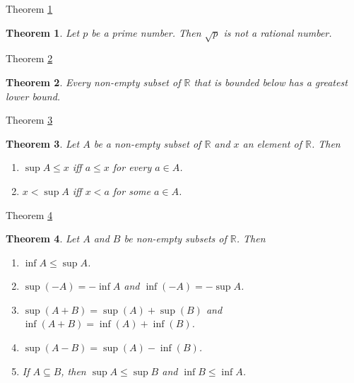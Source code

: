 \documentclass[avery5371,grid]{flashcards}
\newtheorem{theorem}{Theorem}
\newcommand{\bb}[1]{\mathbb{#1}}
\newcommand{\R}{\bb{R}}
\begin{document}
\begin{flashcard}[Theorem]{Theorem \ref{thm29}}
\begin{theorem}
\label{thm29}
Let $p$ be a prime number.  Then $\sqrt{p}$ is not a rational number.
\end{theorem}
\end{flashcard}

\begin{flashcard}[Theorem]{Theorem \ref{thm30}}
\begin{theorem}
\label{thm30}
Every non-empty subset of $\R$ that is bounded below has a greatest
lower bound.
\end{theorem}
\end{flashcard}

\begin{flashcard}[Theorem]{Theorem \ref{thm31}}
\begin{theorem}
\label{thm31}
Let $A$ be a non-empty subset of $\R$ and $x$ an element of $\R$.  Then
\begin{enumerate}
\item $\sup A \leq x$ iff $a \leq x$ for every $a \in A$.
\item $x<\sup A$ iff $x<a$ for some $a \in A$.
\end{enumerate}
\end{theorem}
\end{flashcard}

\begin{flashcard}[Theorem]{Theorem \ref{thm32}}
\begin{theorem}
\label{thm32}
Let $A$ and $B$ be non-empty subsets of $\R$.  Then
\begin{enumerate}
\item $\inf A \leq \sup A$.
\item $\sup (-A) = - \inf A$ and $\inf (-A) = - \sup A$.
\item $\sup (A + B) = \sup (A) + \sup (B)$ and $\inf (A+B) = \inf (A) + \inf (B)$.
\item $\sup (A - B) = \sup (A) - \inf (B)$.
\item If $A \subseteq B$, then $\sup A \leq \sup B$ and $\inf B \leq \inf A$.
\end{enumerate}
\end{theorem}
\end{flashcard}
\end{document}
